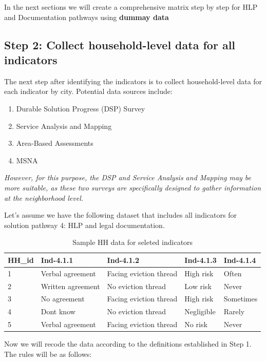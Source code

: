 \documentclass[
]{report}
\providecommand{\tightlist}{%
  \setlength{\itemsep}{0pt}\setlength{\parskip}{0pt}}
\begin{document}
In the next sections we will create a comprehensive matrix step by step
for HLP and Documentation pathways using \textbf{dummay data}

\subsection{Step 2: Collect household-level data for all
indicators}\label{step-2-collect-household-level-data-for-all-indicators}

The next step after identifying the indicators is to collect
household-level data for each indicator by city. Potential data sources
include:

\begin{enumerate}
\def\labelenumi{\arabic{enumi}.}
\tightlist
\item
  Durable Solution Progress (DSP) Survey
\item
  Service Analysis and Mapping
\item
  Area-Based Assessments
\item
  MSNA
\end{enumerate}

\emph{However, for this purpose, the DSP and Service Analysis and
Mapping may be more suitable, as these two surveys are specifically
designed to gather information at the neighborhood level.}

Let's assume we have the following dataset that includes all indicators
for solution pathway 4: HLP and legal documentation.

\begin{longtable}[t]{lllll}
\caption{\label{tab:hh_data}Sample HH data for seleted indicators}\\
\toprule
HH\_id & Ind-4.1.1 & Ind-4.1.2 & Ind-4.1.3 & Ind-4.1.4\\
\midrule
1 & Verbal agreement & Facing eviction thread & High risk & Often\\
2 & Written agreement & No eviction thread & Low risk & Never\\
3 & No agreement & Facing eviction thread & High risk & Sometimes\\
4 & Dont know & No eviction thread & Negligible & Rarely\\
5 & Verbal agreement & Facing eviction thread & No risk & Never\\
\bottomrule
\end{longtable}

Now we will recode the data according to the definitions established in
Step 1. The rules will be as follows:
\end{document}
